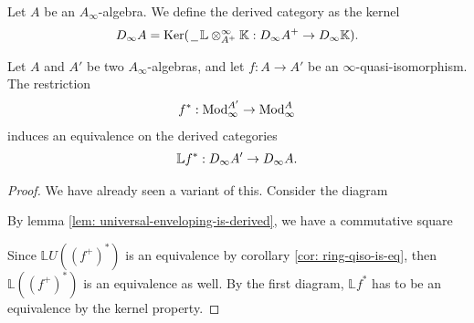 \documentclass[../thesis.tex]{subfiles}
\begin{document}
            \begin{definition}
                Let $A$ be an $A_\infty$-algebra. We define the derived category as the kernel
                \begin{align*}
                    D_\infty A = \tt{Ker}(\argument\mathbb{L}\otimes_{A^+}^\infty\mathbb{K} : D_\infty A^+ \rightarrow D_\infty\mathbb{K})\tt{.}
                \end{align*}
            \end{definition}

            \begin{thm}\label{thm: derived-is-well-defined}
                Let $A$ and $A'$ be two $A_\infty$-algebras, and let $f : A \rightarrow A'$ be an $\infty$-quasi-isomorphism. The restriction
                \begin{align*}
                    f^* : \tt{Mod}_\infty^{A'} \rightarrow \tt{Mod}_\infty^{A}
                \end{align*}
                induces an equivalence on the derived categories
                \begin{align*}
                    \mathbb{L}f^* : D_\infty A' \rightarrow D_\infty A\tt{.}
                \end{align*}
            \end{thm}

            \begin{proof}
                We have already seen a variant of this. Consider the diagram
                \begin{center}
                \end{center}

                By lemma \ref{lem: universal-enveloping-is-derived}, we have a commutative square
                \begin{center}
                \end{center}

                Since $\mathbb{L}U((f^+)^*)$ is an equivalence by corollary \ref{cor: ring-qiso-is-eq}, then $\mathbb{L}((f^+)^*)$ is an equivalence as well. By the first diagram, $\mathbb{L}f^*$ has to be an equivalence by the kernel property.
            \end{proof}
\end{document}

